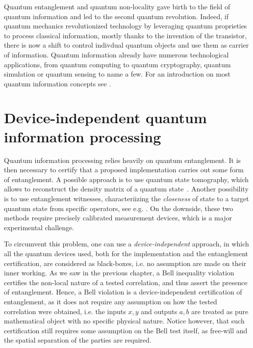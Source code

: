 Quantum entanglement and quantum non-locality gave birth to the field of quantum information and led to the second quantum revolution.
Indeed, if quantum mechanics revolutionized technology by leveraging quantum proprieties to process classical information, mostly thanks to the invention of the transistor, there is now a shift to control indivdual quantum objects and use them as carrier of information.
Quantum information already have numerous technological applications, from quantum computing to quantum cryptography, quantum simulation or quantum sensing to name a few.
For an introduction on most quantum information concepts see \cite{Nielsen2012}.

\section{Device-independent quantum information processing}

Quantum information processing relies heavily on quantum entanglement.
It is then necessary to certify that a proposed implementation carries out some form of entanglement.
A possible approach is to use quantum state tomography, which allows to reconstruct the density matrix of a quantum state~\cite{MauroDAriano2003}.
Another possibility is to use entanglement witnesses, characteriizing the \textit{closeness} of state to a target quantum state from specific operators, see e.g. \cite{Bru2002}.
On the downside, these two methods require precisely calibrated measurement devices, which is a major experimental challenge.

To circumvent this problem, one can use a \textit{device-independent} approach, in which all the quantum devices used, both for the implementation and the entanglement certification, are considered as black-boxes, i.e. no assumption are made on their inner working.
As we saw in the previous chapter, a Bell inequality violation certifies the non-local nature of a tested correlation, and thus assert the presence of entanglement.
Hence, a Bell violation is a device-independent certification of entanglement, as it does not require any assumption on how the tested correlation were obtained, i.e. the inputs $x,y$ and outputs $a,b$ are treated as pure mathematical object with no specific physical nature.
Notice however, that such certification still requires some assumption on the Bell test itself, as free-will and the spatial separation of the parties are required.

\medbreak

